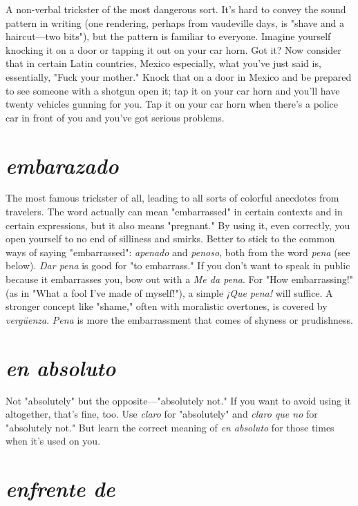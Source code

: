 \documentclass[14pt,a4paper,oneside]{memoir}
\begin{document}
A non-verbal trickster of the most dangerous sort. It's hard to convey the sound pattern
in writing (one rendering, perhaps from vaudeville days, is "shave and
a haircut---two bits"), but the pattern is familiar to everyone. Imagine
yourself knocking it on a door or tapping it out on your car horn. Got
it? Now consider that in certain Latin countries, Mexico especially,
what you've just said is, essentially, "Fuck your mother." Knock that
on a door in Mexico and be prepared to see someone with a shotgun
open it; tap it on your car horn and you'll have twenty vehicles gunning for you. Tap it on your car horn when there's a police car in front
of you and you've got serious problems.

\section{\emph{embarazado}}

The most famous trickster of all, leading to
all sorts of colorful anecdotes from travelers. The word actually can
mean "embarrassed" in certain contexts and in certain expressions,
but it also means "pregnant." By using it, even correctly, you open
yourself to no end of silliness and smirks. Better to stick to the common ways of saying "embarrassed": \emph{apenado} and \emph{penoso}, both from
the word \emph{pena} (see below). \emph{Dar pena} is good for "to embarrass." If you
don't want to speak in public because it embarrasses you, bow out with
a \emph{Me da pena}. For "How embarrassing!" (as in "What a fool I've made
of myself!"), a simple \emph{¡Que pena!} will suffice. A stronger concept like
"shame," often with moralistic overtones, is covered by \emph{vergüenza}.
\emph{Pena} is more the embarrassment that comes of shyness or prudishness.

\section{\emph{en absoluto}}

Not "absolutely" but the opposite---"absolutely not." If you want to avoid using it altogether, that's fine, too.
Use \emph{claro} for "absolutely" and \emph{claro que no} for "absolutely not." But
learn the correct meaning of \emph{en absoluto} for those times when it's
used on you.

\section{\emph{enfrente de}}
\end{document}
